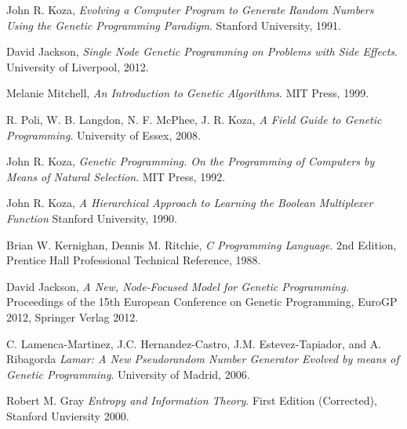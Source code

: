 \documentclass[a4paper,10.5pt]{article}
\begin{document}
\begin{thebibliography}{9}

  John R. Koza, 
  \emph{Evolving a Computer Program to Generate Random Numbers Using the Genetic Programming Paradigm}. 
  Stanford University, 
  1991.

  David Jackson,
  \emph{Single Node Genetic Programming on Problems with Side Effects}.
  University of Liverpool,
  2012.

  Melanie Mitchell,
  \emph{An Introduction to Genetic Algorithms}.
  MIT Press,
  1999.

  R. Poli, W. B. Langdon, N. F. McPhee, J. R. Koza, 
  \emph{A Field Guide to Genetic Programming}. 
  University of Essex, 
  2008.

  John R. Koza, 
  \emph{Genetic Programming. On the Programming of Computers by Means of Natural Selection}. 
  MIT Press, 
  1992.

  John R. Koza,
  \emph{A Hierarchical Approach to Learning the Boolean Multiplexer Function}
  Stanford University,
  1990.

  Brian W. Kernighan, Dennis M. Ritchie, 
  \emph{C Programming Language}.
  2nd Edition, 
  Prentice Hall Professional Technical Reference, 
  1988.

  David Jackson,
  \emph{A New, Node-Focused Model for Genetic Programming}.
  Proceedings of the 15th European Conference on Genetic Programming, EuroGP 2012, 
  Springer Verlag
  2012.

  C. Lamenca-Martinez, J.C. Hernandez-Castro,
  J.M. Estevez-Tapiador, and A. Ribagorda
  \emph{Lamar: A New Pseudorandom Number Generator Evolved by means of Genetic Programming}.
  University of Madrid,
  2006.

  Robert M. Gray
  \emph{Entropy and Information Theory}.
  First Edition (Corrected),
  Stanford Unviersity
  2000.

\end{thebibliography}
\end{document}
